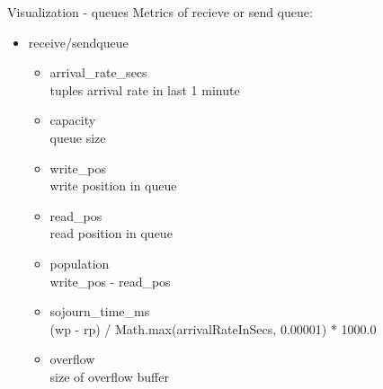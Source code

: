 \documentclass{beamer}
\begin{document}
\begin{frame}{Visualization - queues}
  Metrics of recieve or send queue:
  \begin{itemize}
    \item receive/sendqueue
      \begin{itemize}
	\item arrival\_rate\_secs\\
	  tuples arrival rate in last 1 minute
	\item capacity\\
	  queue size
	\item write\_pos\\
	  write position in queue
	\item read\_pos\\
	  read position in queue
	\item population\\
	  write\_pos - read\_pos
	\item sojourn\_time\_ms\\
	  (wp - rp) / Math.max(arrivalRateInSecs, 0.00001) * 1000.0
	\item overflow\\
	  size of overflow buffer
      \end{itemize}
  \end{itemize}
\end{frame}
\end{document}
